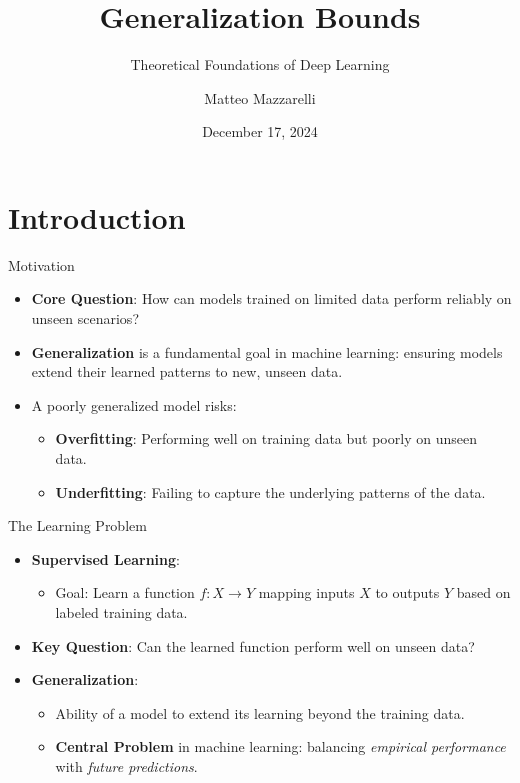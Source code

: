 \documentclass[
  ignorenonframetext,
]{beamer}
\title{Generalization Bounds}
\subtitle{Theoretical Foundations of Deep Learning}
\author{Matteo Mazzarelli}
\date{December 17, 2024}
\providecommand{\tightlist}{%
  \setlength{\itemsep}{0pt}\setlength{\parskip}{0pt}}\usepackage{longtable,booktabs,array}
\begin{document}
\frame{\titlepage}


\section{Introduction}\label{introduction}

\begin{frame}{Motivation}
\label{motivation}
\begin{itemize}
\tightlist
\item
  \textbf{Core Question}: How can models trained on limited data perform
  reliably on unseen scenarios?
\item
  \textbf{Generalization} is a fundamental goal in machine learning:
  ensuring models extend their learned patterns to new, unseen data.
\item
  A poorly generalized model risks:

  \begin{itemize}
  \tightlist
  \item
    \textbf{Overfitting}: Performing well on training data but poorly on
    unseen data.
  \item
    \textbf{Underfitting}: Failing to capture the underlying patterns of
    the data.
  \end{itemize}
\end{itemize}
\end{frame}

\begin{frame}{The Learning Problem}
\label{the-learning-problem}
\begin{itemize}
\tightlist
\item
  \textbf{Supervised Learning}:

  \begin{itemize}
  \tightlist
  \item
    Goal: Learn a function \(f: X \to Y\) mapping inputs \(X\) to
    outputs \(Y\) based on labeled training data.
  \end{itemize}
\item
  \textbf{Key Question}: Can the learned function perform well on unseen
  data?
\item
  \textbf{Generalization}:

  \begin{itemize}
  \tightlist
  \item
    Ability of a model to extend its learning beyond the training data.
  \item
    \textbf{Central Problem} in machine learning: balancing
    \emph{empirical performance} with \emph{future predictions}.
  \end{itemize}
\end{itemize}
\end{frame}
\end{document}
